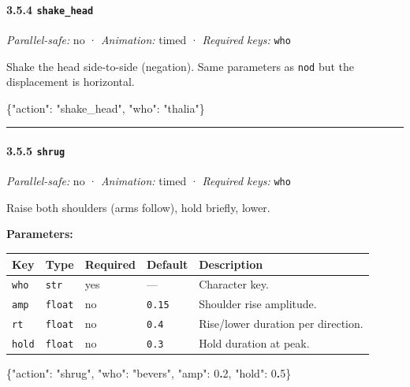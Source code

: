 \documentclass[
  11pt,
]{book}
\newenvironment{Shaded}{}{}
\newcommand{\DataTypeTok}[1]{\textcolor[rgb]{0.56,0.13,0.00}{#1}}
\newcommand{\DecValTok}[1]{\textcolor[rgb]{0.25,0.63,0.44}{#1}}
\newcommand{\ErrorTok}[1]{\textcolor[rgb]{1.00,0.00,0.00}{\textbf{#1}}}
\newcommand{\FunctionTok}[1]{\textcolor[rgb]{0.02,0.16,0.49}{#1}}
\newcommand{\StringTok}[1]{\textcolor[rgb]{0.25,0.44,0.63}{#1}}
\begin{document}
\paragraph{\texorpdfstring{3.5.4
\texttt{shake\_head}}{3.5.4 shake\_head}}\label{shake_head}

\emph{Parallel-safe:} no · \emph{Animation:} timed · \emph{Required
keys:} \texttt{who}

Shake the head side-to-side (negation). Same parameters as \texttt{nod}
but the displacement is horizontal.

\begin{Shaded}
\begin{Highlighting}[]
\FunctionTok{\{}\DataTypeTok{"action"}\FunctionTok{:} \StringTok{"shake\_head"}\FunctionTok{,} \DataTypeTok{"who"}\FunctionTok{:} \StringTok{"thalia"}\FunctionTok{\}}
\end{Highlighting}
\end{Shaded}

\begin{center}\rule{0.5\linewidth}{0.5pt}\end{center}

\paragraph{\texorpdfstring{3.5.5
\texttt{shrug}}{3.5.5 shrug}}\label{shrug}

\emph{Parallel-safe:} no · \emph{Animation:} timed · \emph{Required
keys:} \texttt{who}

Raise both shoulders (arms follow), hold briefly, lower.

\textbf{Parameters:}

\begin{longtable}[]{@{}lllll@{}}
\toprule\noalign{}
Key & Type & Required & Default & Description \\
\midrule\noalign{}
\endhead
\bottomrule\noalign{}
\endlastfoot
\texttt{who} & \texttt{str} & yes & --- & Character key. \\
\texttt{amp} & \texttt{float} & no & \texttt{0.15} & Shoulder rise
amplitude. \\
\texttt{rt} & \texttt{float} & no & \texttt{0.4} & Rise/lower duration
per direction. \\
\texttt{hold} & \texttt{float} & no & \texttt{0.3} & Hold duration at
peak. \\
\end{longtable}

\begin{Shaded}
\begin{Highlighting}[]
\FunctionTok{\{}\DataTypeTok{"action"}\FunctionTok{:} \StringTok{"shrug"}\FunctionTok{,} \DataTypeTok{"who"}\FunctionTok{:} \StringTok{"bevers"}\FunctionTok{,} \DataTypeTok{"amp"}\FunctionTok{:} \DecValTok{0}\ErrorTok{.}\DecValTok{2}\FunctionTok{,} \DataTypeTok{"hold"}\FunctionTok{:} \DecValTok{0}\ErrorTok{.}\DecValTok{5}\FunctionTok{\}}
\end{Highlighting}
\end{Shaded}
\end{document}
